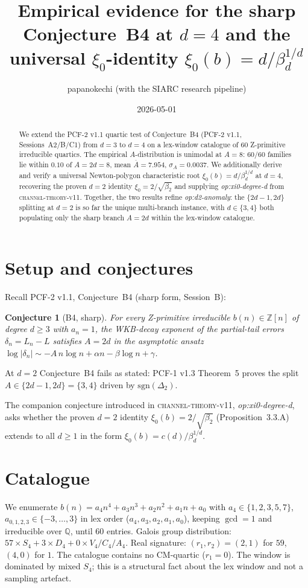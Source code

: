 \documentclass[11pt]{amsart}
\title{Empirical evidence for the sharp Conjecture~B4 at $d=4$ and the
universal $\xi_0$-identity $\xi_0(b)=d/\beta_d^{1/d}$}
\author{papanokechi (with the SIARC research pipeline)}
\date{2026-05-01}
\newtheorem{conjecture}[theorem]{Conjecture}
\begin{document}
\maketitle

\begin{abstract}
We extend the PCF-2 v1.1 quartic test of Conjecture~B4 (PCF-2 v1.1,
Sessions~A2/B/C1) from $d=3$ to $d=4$ on a lex-window catalogue of
$60$ Z-primitive irreducible quartics. The empirical
$A$-distribution is unimodal at $A=8$: $60/60$ families lie within
$0.10$ of $A=2d=8$, mean $\overline{A}=7.954$, $\sigma_A=0.0037$.
We additionally derive and verify a universal Newton-polygon
characteristic root $\xi_0(b)=d/\beta_d^{1/d}$ at $d=4$, recovering
the proven $d=2$ identity $\xi_0=2/\sqrt{\beta_2}$ and supplying
\emph{op:xi0-degree-d} from \textsc{channel-theory-v11}. Together, the
two results refine \emph{op:d2-anomaly}: the $\{2d-1,2d\}$
splitting at $d=2$ is so far the unique multi-branch instance, with
$d\in\{3,4\}$ both populating only the sharp branch $A=2d$ within the
lex-window catalogue.
\end{abstract}

\section{Setup and conjectures}

Recall PCF-2 v1.1, Conjecture~B4 (sharp form, Session~B):
\begin{conjecture}[B4, sharp]\label{conj:B4-sharp}
For every Z-primitive irreducible $b(n)\in\mathbb{Z}[n]$ of degree
$d\ge 3$ with $a_n=1$, the WKB-decay exponent of the partial-tail
errors $\delta_n=L_n - L$ satisfies $A=2d$ in the asymptotic ansatz
$\log|\delta_n|\sim -A\,n\log n + \alpha n - \beta\log n + \gamma$.
\end{conjecture}
At $d=2$ Conjecture~B4 fails as stated: PCF-1 v1.3 Theorem~5 proves
the split $A\in\{2d-1,2d\}=\{3,4\}$ driven by $\mathrm{sgn}(\Delta_2)$.

The companion conjecture introduced in \textsc{channel-theory-v11},
\emph{op:xi0-degree-d}, asks whether the proven $d=2$ identity
$\xi_0(b)=2/\sqrt{\beta_2}$ (Proposition~3.3.A) extends to all $d\ge 1$
in the form $\xi_0(b)=c(d)/\beta_d^{1/d}$.

\section{Catalogue}

We enumerate $b(n) = a_4 n^4 + a_3 n^3 + a_2 n^2 + a_1 n + a_0$ with
$a_4\in\{1,2,3,5,7\}$, $a_{0,1,2,3}\in\{-3,\ldots,3\}$ in lex order
($a_4, a_3, a_2, a_1, a_0$), keeping $\gcd=1$ and irreducible
over $\mathbb{Q}$, until $60$ entries. Galois group distribution:
$57\times S_4 + 3\times D_4 + 0\times V_4/C_4/A_4$. Real signature:
$(r_1,r_2)=(2,1)$ for $59$, $(4,0)$ for $1$. The catalogue contains
no CM-quartic ($r_1=0$). The window is dominated by mixed $S_4$;
this is a structural fact about the lex window and not a sampling
artefact.
\end{document}
